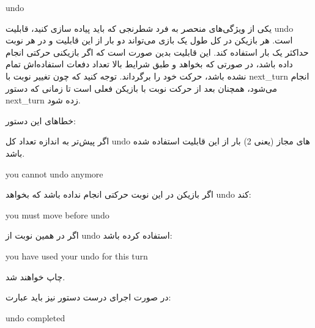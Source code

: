 \documentclass[]{article}
\begin{document}
\hrulefill



\begin{tcolorbox}[boxrule=0pt]
	\begin{latin}
  	  \large{
  	  	undo
		}
	\end{latin}
\end{tcolorbox}

یکی از ویژگی‌های منحصر به فرد شطرنجی که باید پیاده سازی کنید، قابلیت undo است. هر بازیکن در کل طول یک بازی می‌تواند دو بار از این قابلیت و در هر نوبت حداکثر یک بار استفاده کند. این قابلیت بدین صورت است که اگر بازیکنی حرکتی انجام داده باشد، در صورتی که بخواهد و طبق شرایط بالا تعداد دفعات استفاده‌اش تمام نشده باشد، حرکت خود را برگرداند. توجه کنید که چون تغییر نوبت با next\_turn انجام می‌شود، همچنان بعد از حرکت نوبت با بازیکن فعلی است تا زمانی که دستور next\_turn زده شود.

خطاهای این دستور:

اگر پیش‌تر به اندازه تعداد کل undo های مجاز (یعنی 2) بار از این قابلیت استفاده شده باشد.


\begin{tcolorbox}[boxrule=0pt]
	\begin{latin}
  	  \large{
  	  	you cannot undo anymore
		}
	\end{latin}
\end{tcolorbox}

اگر بازیکن در این نوبت حرکتی انجام نداده باشد که بخواهد undo کند:


\begin{tcolorbox}[boxrule=0pt]
	\begin{latin}
  	  \large{
  	  	you must move before undo
		}
	\end{latin}
\end{tcolorbox}

اگر در همین نوبت از undo استفاده کرده باشد:



\begin{tcolorbox}[boxrule=0pt]
	\begin{latin}
  	  \large{
  	  	you have used your undo for this turn
		}
	\end{latin}
\end{tcolorbox}

چاپ خواهند شد.

در صورت اجرای درست دستور نیز باید عبارت:


\begin{tcolorbox}[boxrule=0pt]
	\begin{latin}
  	  \large{
  	  	undo completed
		}
	\end{latin}
\end{tcolorbox}
\end{document}

